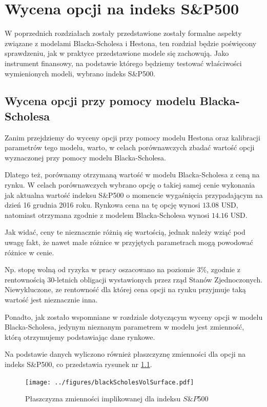 \documentclass{pracamgr}
\begin{document}
\chapter{Wycena opcji na indeks S\&P500}\label{r:sp}


W poprzednich rozdziałach zostały przedstawione zostały formalne aspekty związane z modelami 
Blacka-Scholesa i Hestona, ten rozdział będzie poświęcony sprawdzeniu, jak w praktyce przedstawione 
modele się zachowują.
Jako instrument finansowy, na podstawie którego będziemy testować właściwości wymienionych modeli, 
wybrano indeks S\&P500. 

\section{Wycena opcji przy pomocy modelu Blacka-Scholesa}

Zanim przejdziemy do wyceny opcji  przy pomocy modelu Hestona oraz kalibracji
parametrów tego modelu, warto, w celach porównawczych zbadać wartość opcji 
wyznaczonej przy pomocy modelu Blacka-Scholesa. 


Dlatego też, porównamy otrzymaną wartość w modelu Blacka-Scholesa z ceną na rynku.
W celach porównawczych wybrano opcję o takiej samej cenie wykonania jak aktualna wartość indeksu 
S\&P500 o momencie wygaśnięcia przypadającym na dzień 16 grudnia 2016 roku. 
Rynkowa cena na tę opcję wynosi $13.08$ USD, natomiast otrzymana zgodnie z modelem Blacka-Scholesa 
wynosi $14.16$ USD.

Jak widać, ceny te nieznacznie różnią się wartością, jednak należy wziąć pod uwagę fakt, że nawet 
małe różnice w przyjętych parametrach mogą powodować różnice w cenie. 

Np. stopę wolną od ryzyka w pracy oszacowano na poziomie 3$\%$, zgodnie z rentownością 30-letnich 
obligacji wystawionych przez rząd Stanów Zjednoczonych. Niewykluczone, ze rentowność dla której cena 
opcji na rynku przyjmuje taką wartość jest nieznacznie inna.

Ponadto, jak zostało wspomniane w rozdziale dotyczącym wyceny opcji w modelu Blacka-Scholesa,
jedynym nieznanym parametrem w modelu jest zmienność, którą otrzymujemy podstawiając
dane rynkowe. 

Na podstawie danych wyliczono również płaszczyznę zmienności dla 
opcji na indeks S\&P500, co przedstawia rysunek nr \ref{fig:volatilitySurface}. 

\begin{figure}
  \centering
  \texttt{[image: ../figures/blackScholesVolSurface.pdf]}
  \caption{Płaszczyzna zmienności implikowanej dla indeksu $S\&P$500}
  \label{fig:volatilitySurface}
\end{figure}
\end{document}
